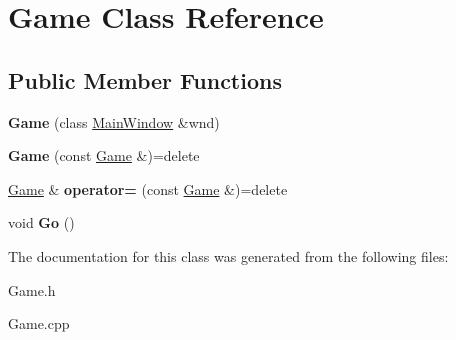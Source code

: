 \hypertarget{class_game}{}\section{Game Class Reference}
\label{class_game}
\subsection*{Public Member Functions}
\begin{DoxyCompactItemize}
\item 
\mbox{\label{class_game_ac7d110c84639f35b32098bcc22966446}} 
{\bfseries Game} (class \hyperlink{class_main_window}{Main\+Window} \&wnd)
\item 
\mbox{\label{class_game_abb28875d74d25fa9e0dcdbe37c6ad89c}} 
{\bfseries Game} (const \hyperlink{class_game}{Game} \&)=delete
\item 
\mbox{\label{class_game_a4d0c0503733cc50b0b5cb8d7ef1237ec}} 
\hyperlink{class_game}{Game} \& {\bfseries operator=} (const \hyperlink{class_game}{Game} \&)=delete
\item 
\mbox{\label{class_game_ac7f625a10c7d19d4d38a31f400c77ddc}} 
void {\bfseries Go} ()
\end{DoxyCompactItemize}


The documentation for this class was generated from the following files\+:\begin{DoxyCompactItemize}
\item 
Game.\+h\item 
Game.\+cpp\end{DoxyCompactItemize}
